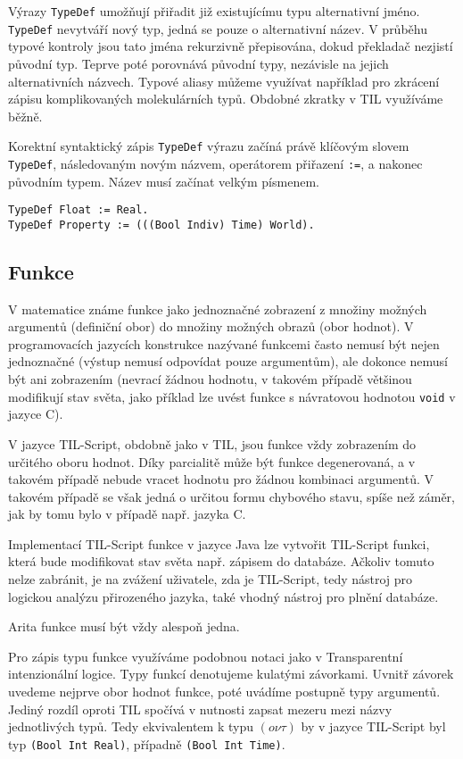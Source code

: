 Výrazy \lstinline{TypeDef} umožňují přiřadit již existujícímu typu alternativní jméno.
\lstinline{TypeDef} nevytváří nový typ, jedná se pouze o alternativní název. V průběhu typové
kontroly jsou tato jména rekurzivně přepisována, dokud překladač nezjistí původní typ. Teprve poté
porovnává původní typy, nezávisle na jejich alternativních názvech. Typové aliasy můžeme využívat
například pro zkrácení zápisu komplikovaných molekulárních typů. Obdobné zkratky v TIL využíváme
běžně.

Korektní syntaktický zápis \lstinline{TypeDef} výrazu začíná právě klíčovým slovem
\lstinline{TypeDef}, následovaným novým názvem, operátorem přiřazení \lstinline{:=}, a nakonec
původním typem. Název musí začínat velkým písmenem.

\begin{lstlisting}[caption={Výraz TypeDef}]
TypeDef Float := Real.
TypeDef Property := (((Bool Indiv) Time) World).
\end{lstlisting}

\subsection{Funkce}

V matematice známe funkce jako jednoznačné zobrazení z množiny možných argumentů (definiční obor)
do množiny možných obrazů (obor hodnot). V programovacích jazycích konstrukce nazývané funkcemi
často nemusí být nejen jednoznačné (výstup nemusí odpovídat pouze argumentům), ale dokonce nemusí
být ani zobrazením (nevrací žádnou hodnotu, v takovém případě většinou modifikují stav světa,
jako příklad lze uvést funkce s návratovou hodnotou \lstinline{void} v jazyce C).

V jazyce TIL-Script, obdobně jako v TIL, jsou funkce vždy zobrazením do určitého oboru hodnot. Díky
parcialitě může být funkce degenerovaná, a v takovém případě nebude vracet hodnotu pro žádnou
kombinaci argumentů. V takovém případě se však jedná o určitou formu chybového stavu, spíše než
záměr, jak by tomu bylo v případě např. jazyka C.

Implementací TIL-Script funkce v jazyce Java lze vytvořit TIL-Script funkci, která bude modifikovat
stav světa např. zápisem do databáze. Ačkoliv tomuto nelze zabránit, je na zvážení uživatele, zda
je TIL-Script, tedy nástroj pro logickou analýzu přirozeného jazyka, také vhodný nástroj pro plnění
databáze.

Arita funkce musí být vždy alespoň jedna.

Pro zápis typu funkce využíváme podobnou notaci jako v Transparentní intenzionální logice.
Typy funkcí denotujeme kulatými závorkami. Uvnitř závorek uvedeme nejprve obor hodnot funkce,
poté uvádíme postupně typy argumentů. Jediný rozdíl oproti TIL spočívá v nutnosti zapsat mezeru
mezi názvy jednotlivých typů. Tedy ekvivalentem k typu $(o\nu\tau)$ by v jazyce TIL-Script byl typ
\lstinline{(Bool Int Real)}, případně \lstinline{(Bool Int Time)}.

